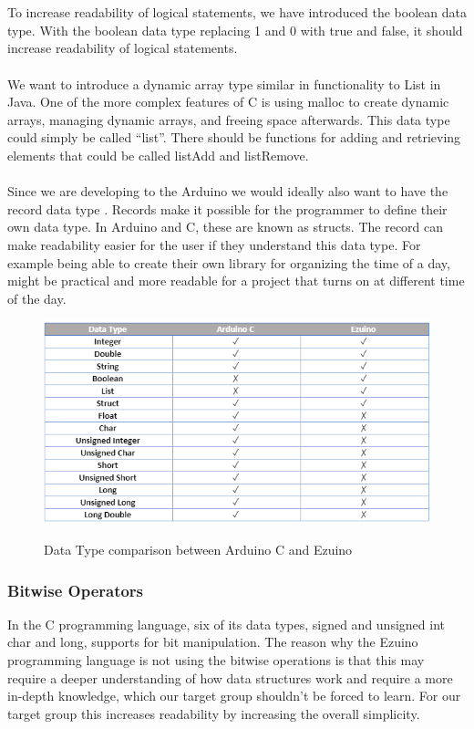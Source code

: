 \\\\
To increase readability of logical statements, we have introduced the boolean data type. With the boolean data type replacing 1 and 0 with true and false, it should increase readability of logical statements.
\\ \\
We want to introduce a dynamic array type similar in functionality to List in Java. One of the more complex features of C is using malloc to create dynamic arrays, managing dynamic arrays, and freeing space afterwards. This data type could simply be called “list”. There should be functions for adding and retrieving elements that could be called listAdd and listRemove.
\\ \\
Since we are developing to the Arduino we would ideally also want to have the record data type \cite{conceptsOfProgrammingLanguages}. Records make it possible for the programmer to define their own data type. In Arduino and C, these are known as structs. The record can make readability easier for the user if they understand this data type. For example being able to create their own library for organizing the time of a day, might be practical and more readable for a project that turns on at different time of the day.  
\begin{figure}[H]
\centering
\caption{Data Type comparison between Arduino C and Ezuino}
\includegraphics[scale=0.85]{figures/language_features/langf01.png}
\label{lf01}
\end{figure}
\subsubsection*{Bitwise Operators}
In the C programming language, six of its data types, signed and unsigned int char and long, supports for bit manipulation. 
The reason why the Ezuino programming language is not using the bitwise operations is that this may require a deeper understanding of how data structures work and require a more in-depth knowledge, which our target group shouldn’t be forced to learn. For our target group this increases readability by increasing the overall simplicity.
